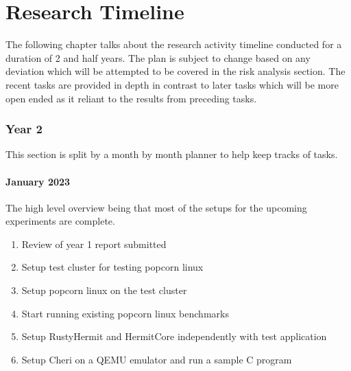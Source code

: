 
\chapter{Research Timeline}  %
The following chapter talks about the research activity timeline conducted for a duration of 2 and half years. 
The plan is subject to change based on any deviation which will be attempted to be covered in the risk analysis 
section. The recent tasks are provided in depth in contrast to later tasks which will be more open ended 
as it reliant to the results from preceding tasks. 

\subsection{Year 2}
This section is split by a month by month planner to help keep tracks of tasks. 

\subsubsection{January 2023}
The high level overview being that most of the setups for the upcoming experiments
are complete. 
\begin{enumerate}
    \item Review of year 1 report submitted 
    \item Setup test cluster for testing popcorn linux 
    \item Setup popcorn linux on the test cluster
    \item Start running existing popcorn linux benchmarks 
    \item Setup RustyHermit and HermitCore independently with test application 
    \item Setup Cheri on a QEMU emulator and run a sample C program 
  \end{enumerate}


